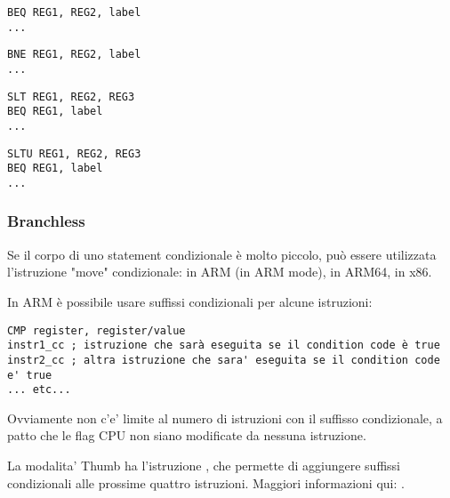 \begin{lstlisting}[caption=Check for equal values,style=customasmMIPS]
BEQ REG1, REG2, label
...
\end{lstlisting}

\begin{lstlisting}[caption=Check for non-equal values,style=customasmMIPS]
BNE REG1, REG2, label
...
\end{lstlisting}

\begin{lstlisting}[caption=Check for less than (signed),style=customasmMIPS]
SLT REG1, REG2, REG3
BEQ REG1, label
...
\end{lstlisting}

\begin{lstlisting}[caption=Check for less than (unsigned),style=customasmMIPS]
SLTU REG1, REG2, REG3
BEQ REG1, label
...
\end{lstlisting}

\subsubsection{Branchless}

Se il corpo di uno statement condizionale è molto piccolo, può essere utilizzata l'istruzione "move" condizionale: 
 in ARM (in ARM mode),  in ARM64,  in x86.


In ARM è possibile usare suffissi condizionali per alcune istruzioni:

\begin{lstlisting}[caption=ARM (\ARMMode),style=customasmARM]
CMP register, register/value
instr1_cc ; istruzione che sarà eseguita se il condition code è true
instr2_cc ; altra istruzione che sara' eseguita se il condition code e' true
... etc...
\end{lstlisting}

Ovviamente non c'e' limite al numero di istruzioni con il suffisso condizionale, a patto che le flag CPU non siano modificate da nessuna istruzione. 


La modalita' Thumb ha l'istruzione , che permette di aggiungere suffissi condizionali alle prossime quattro istruzioni.
Maggiori informazioni qui: .

